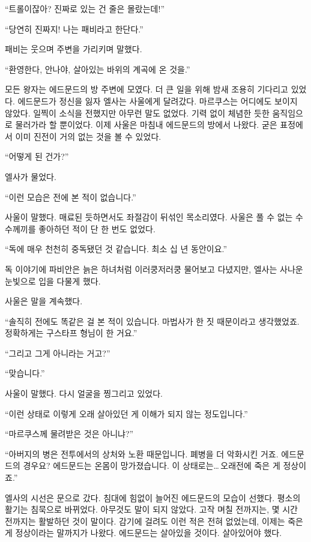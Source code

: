 ``트롤이잖아? 진짜로 있는 건 줄은 몰랐는데!''

``당연히 진짜지! 나는 패비라고 한단다.''

패비는 웃으며 주변을 가리키며 말했다.

``환영한다, 안나야, 살아있는 바위의 계곡에 온 것을.''

\textbreak

모든 왕자는 에드문드의 방 주변에 모였다. 더 큰 일을 위해 밤새 조용히 기다리고 있었다. 에드문드가 정신을 잃자 엘사는 사울에게 달려갔다. 마르쿠스는 어디에도 보이지 않았다. 일찍이 소식을 전했지만 아무런 말도 없었다. 기력 없이 체념한 듯한 움직임으로 물러가라 할 뿐이었다. 이제 사울은 마침내 에드문드의 방에서 나왔다. 굳은 표정에서 이미 진전이 거의 없는 것을 볼 수 있었다.

``어떻게 된 건가?''

엘사가 물었다.

``이런 모습은 전에 본 적이 없습니다.''

사울이 말했다. 매료된 듯하면서도 좌절감이 뒤섞인 목소리였다. 사울은 풀 수 없는 수수께끼를 좋아하던 적이 단 한 번도 없었다.

``독에 매우 천천히 중독됐던 것 같습니다. 최소 십 년 동안이요.''

독 이야기에 파비안은 늙은 하녀처럼 이러쿵저러쿵 물어보고 다녔지만, 엘사는 사나운 눈빛으로 입을 다물게 했다.

사울은 말을 계속했다.

``솔직히 전에도 똑같은 걸 본 적이 있습니다. 마법사가 한 짓 때문이라고 생각했었죠. 정확하게는 구스타프 형님이 한 거요.''

``그리고 그게 아니라는 거고?''

``맞습니다.''

사울이 말했다. 다시 얼굴을 찡그리고 있었다.

``이런 상태로 이렇게 오래 살아있던 게 이해가 되지 않는 정도입니다.''

``마르쿠스께 물려받은 것은 아니냐?''

``아버지의 병은 전투에서의 상처와 노환 때문입니다. 폐병을 더 악화시킨 거죠. 에드문드의 경우요? 에드문드는 온몸이 망가졌습니다. 이 상태로는\ldots\,오래전에 죽은 게 정상이죠.''

엘사의 시선은 문으로 갔다. 침대에 힘없이 늘어진 에드문드의 모습이 선했다. 평소의 활기는 침묵으로 바뀌었다. 아무것도 말이 되지 않았다. 고작 며칠 전까지는, 몇 시간 전까지는 활발하던 것이 말이다. 감기에 걸려도 이런 적은 전혀 없었는데, 이제는 죽은 게 정상이라는 말까지가 나왔다. 에드문드는 살아있을 것이다. 살아있어야 했다.

